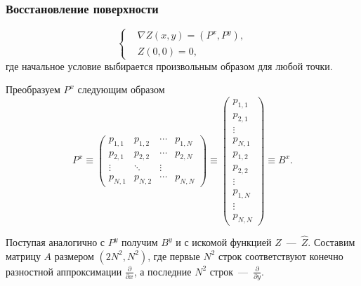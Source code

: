 \documentclass{beamer}
\begin{document}
\begin{frame}[allowframebreaks]
    \frametitle{Восстановление поверхности}

    \begin{equation}
        \left\{
            \begin{split}
        &\nabla Z(x,y) = (P^x, P^y), \\
        &Z(0,0) = 0,
            \end{split}
        \right.
    \end{equation}
    \small где начальное условие выбирается произвольным образом для любой точки.

    \small Преобразуем $P^x$ следующим образом
    \begin{equation}
        P^x \equiv
        \left(
            \begin{array}{cccc}
                p_{1,1} & p_{1,2} & \cdots & p_{1,N} \\
                p_{2,1} & p_{2,2} & \cdots & p_{2,N} \\
                \vdots & \ddots & \vdots  \\
                p_{N,1} & p_{N,2} & \cdots & p_{N,N}
            \end{array}
        \right)
        \equiv{}
        \left(%
            \begin{array}{c}
                p_{1,1} \\
                p_{2,1} \\
                \vdots \\
                p_{N,1} \\
                p_{1,2} \\
                p_{2,2} \\
                \vdots \\
                p_{1,N} \\
                \vdots \\
                p_{N,N}
            \end{array}
        \right)
        \equiv{}  B^x.
    \end{equation}

    \small Поступая аналогично с $P^y$ получим $B^y$ и с искомой функцией $Z$~---~$\hat{Z}$.
    \small Составим матрицу $A$ размером $(2N^2, N^2)$, где первые $N^2$ строк соответствуют конечно разностной аппроксимации $\frac{\partial}{\partial x}$, а последние $N^2$ строк~---~$\frac{\partial}{\partial y}$.


\end{frame}
\end{document}
